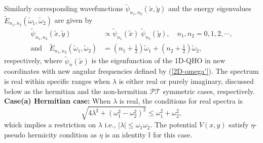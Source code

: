 \documentclass[a4paper, 12pt]{article}
\newcommand{\td}[1]{\tilde{#1}}
\begin{document}
Similarly corresponding wavefunctions $\td{\psi}_{n_1,n_2}(\td{x},\td{y})$ and the energy eigenvalues $\td{E}_{n_1,n_2}(\td{\omega}_1,\td{\omega}_2)$ are given by
\begin{align}\label{2D-psi-II'}
  \tilde{\psi}_{n_1,n_2}(\td{x},\td{y}) &\propto
  \td{\psi}_{n_1}(\td{x})\;\td{\psi}_{n_2}(\td{y}),\quad n_1,n_2 = 0,1,2,\cdots, \\\label{2D-E-II'}
  \mbox{and}\quad \tilde{E}_{n_1,n_2}(\td{\omega}_1,\td{\omega}_2) &= \left(n_1+\frac{1}{2}\right)\td{\omega}_1+\left(n_2+\frac{1}{2}\right)\td{\omega}_2,
\end{align}
respectively, where $\td{\psi}_{n}(\td{x})$ is the eigenfunction of the 1D-QHO in new coordinates with new angular frequencies defined by (\ref{2D-omega'}).
The spectrum is real within specific ranges when \(\lambda\) is either real or purely imaginary, discussed below as the hermitian and the non-hermitian $\mathcal{PT}$ symmetric cases, respectively.\\

{\bf Case(a) Hermitian case:} When $\lambda$ is real, the conditions for real spectra is
\begin{equation}
  \sqrt{4 \lambda ^2+(\omega _1^2-\omega_2^2)^2}\leq\omega_1^2+\omega_2^2,\label{real2D}
\end{equation}
which implies a restriction on $\lambda$ i.e., $|\lambda| \leq \omega_1 \omega_2$.
The potential $V(x,y)$ satisfy $\eta$-pseudo hermicity condition as $\eta$ is an identity $\mathbb{I}$ for this case. \\
\end{document}
